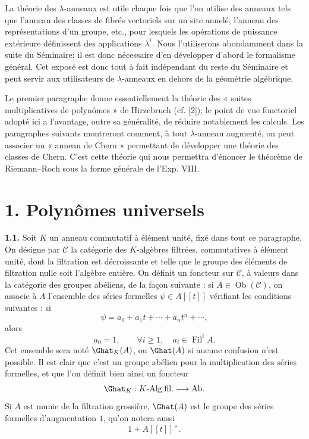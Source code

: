 \documentclass[11pt]{article}
\newcommand{\Fil}{\operatorname{Fil}}
\begin{document}
La théorie des \(\lambda\)-anneaux est utile chaque fois que l'on utilise des anneaux tels que l'anneau des classes de fibrés vectoriels sur un site annelé, l'anneau des représentations d'un groupe, etc., pour lesquels les opérations de puissance extérieure définissent des applications \(\lambda^i\). Nous l'utiliserons abondamment dans la suite du Séminaire; il est donc nécessaire d'en développer d'abord le formalisme général. Cet exposé est donc tout à fait indépendant du reste du Séminaire et peut servir aux utilisateurs de \(\lambda\)-anneaux en dehors de la géométrie algébrique.

Le premier paragraphe donne essentiellement la théorie des « suites multiplicatives de polynômes » de Hirzebruch (cf. [2]); le point de vue fonctoriel adopté ici a l'avantage, outre sa généralité, de réduire notablement les calculs. Les paragraphes suivants montreront comment, à tout \(\lambda\)-anneau augmenté, on peut associer un « anneau de Chern » permettant de développer une théorie des classes de Chern. C'est cette théorie qui nous permettra d'énoncer le théorème de Riemann--Roch sous la forme générale de l'Exp. VIII.

\section*{1. Polynômes universels}

\textbf{1.1.} Soit \(K\) un anneau commutatif à élément unité, fixé dans tout ce paragraphe. On désigne par \(\mathcal C\) la catégorie des \(K\)-algèbres filtrées, commutatives à élément unité, dont la filtration est décroissante et telle que le groupe des éléments de filtration nulle soit l'algèbre entière. On définit un foncteur sur \(\mathcal C\), à valeurs dans la catégorie des groupes abéliens, de la façon suivante : si \(A\in\operatorname{Ob}(\mathcal C)\), on associe à \(A\) l'ensemble des séries formelles \(\psi\in A[[t]]\) vérifiant les conditions suivantes : si
\[
  \psi=a_0+a_1t+\cdots+a_nt^n+\cdots,
\]
alors
\begin{equation}\tag{1.1.1}
  a_0=1,\qquad \forall i\geq 1,\quad a_i\in\Fil^i A .
\end{equation}
Cet ensemble sera noté \(\Ghat_K(A)\), ou \(\Ghat(A)\) si aucune confusion n'est possible. Il est clair que c'est un groupe abélien pour la multiplication des séries formelles, et que l'on définit bien ainsi un foncteur
\[
  \Ghat_K:K\text{-Alg.fil.}\longrightarrow \mathrm{Ab}.
\]
Si \(A\) est munie de la filtration grossière, \(\Ghat(A)\) est le groupe des séries formelles d'augmentation \(1\), qu'on notera aussi
\[
  1+A[[t]]^+.
\]
\end{document}
